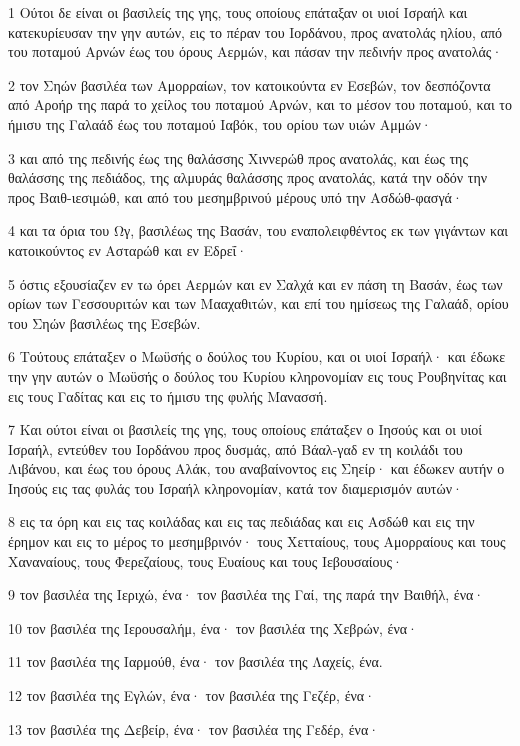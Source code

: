 \par 1 Ούτοι δε είναι οι βασιλείς της γης, τους οποίους επάταξαν οι υιοί Ισραήλ και κατεκυρίευσαν την γην αυτών, εις το πέραν του Ιορδάνου, προς ανατολάς ηλίου, από του ποταμού Αρνών έως του όρους Αερμών, και πάσαν την πεδινήν προς ανατολάς·
\par 2 τον Σηών βασιλέα των Αμορραίων, τον κατοικούντα εν Εσεβών, τον δεσπόζοντα από Αροήρ της παρά το χείλος του ποταμού Αρνών, και το μέσον του ποταμού, και το ήμισυ της Γαλαάδ έως του ποταμού Ιαβόκ, του ορίου των υιών Αμμών·
\par 3 και από της πεδινής έως της θαλάσσης Χιννερώθ προς ανατολάς, και έως της θαλάσσης της πεδιάδος, της αλμυράς θαλάσσης προς ανατολάς, κατά την οδόν την προς Βαιθ-ιεσιμώθ, και από του μεσημβρινού μέρους υπό την Ασδώθ-φασγά·
\par 4 και τα όρια του Ωγ, βασιλέως της Βασάν, του εναπολειφθέντος εκ των γιγάντων και κατοικούντος εν Ασταρώθ και εν Εδρεΐ·
\par 5 όστις εξουσίαζεν εν τω όρει Αερμών και εν Σαλχά και εν πάση τη Βασάν, έως των ορίων των Γεσσουριτών και των Μααχαθιτών, και επί του ημίσεως της Γαλαάδ, ορίου του Σηών βασιλέως της Εσεβών.
\par 6 Τούτους επάταξεν ο Μωϋσής ο δούλος του Κυρίου, και οι υιοί Ισραήλ· και έδωκε την γην αυτών ο Μωϋσής ο δούλος του Κυρίου κληρονομίαν εις τους Ρουβηνίτας και εις τους Γαδίτας και εις το ήμισυ της φυλής Μανασσή.
\par 7 Και ούτοι είναι οι βασιλείς της γης, τους οποίους επάταξεν ο Ιησούς και οι υιοί Ισραήλ, εντεύθεν του Ιορδάνου προς δυσμάς, από Βάαλ-γαδ εν τη κοιλάδι του Λιβάνου, και έως του όρους Αλάκ, του αναβαίνοντος εις Σηείρ· και έδωκεν αυτήν ο Ιησούς εις τας φυλάς του Ισραήλ κληρονομίαν, κατά τον διαμερισμόν αυτών·
\par 8 εις τα όρη και εις τας κοιλάδας και εις τας πεδιάδας και εις Ασδώθ και εις την έρημον και εις το μέρος το μεσημβρινόν· τους Χετταίους, τους Αμορραίους και τους Χαναναίους, τους Φερεζαίους, τους Ευαίους και τους Ιεβουσαίους·
\par 9 τον βασιλέα της Ιεριχώ, ένα· τον βασιλέα της Γαί, της παρά την Βαιθήλ, ένα·
\par 10 τον βασιλέα της Ιερουσαλήμ, ένα· τον βασιλέα της Χεβρών, ένα·
\par 11 τον βασιλέα της Ιαρμούθ, ένα· τον βασιλέα της Λαχείς, ένα.
\par 12 τον βασιλέα της Εγλών, ένα· τον βασιλέα της Γεζέρ, ένα·
\par 13 τον βασιλέα της Δεβείρ, ένα· τον βασιλέα της Γεδέρ, ένα·
